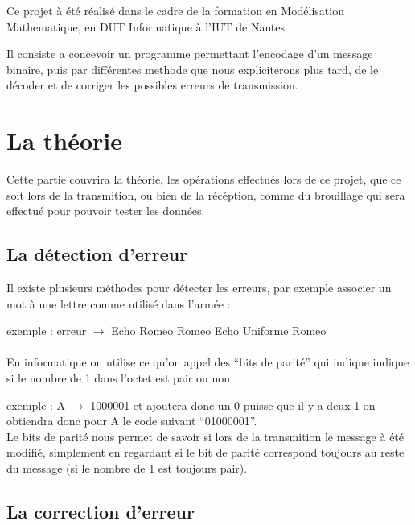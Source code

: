 Ce projet à été réalisé dans le cadre de la formation en Modélisation Mathematique, en DUT Informatique à l'IUT de Nantes.

Il consiste a concevoir un programme permettant l'encodage d'un message binaire, puis par différentes methode que nous expliciterons plus tard, de le décoder et de corriger les possibles erreurs de transmission.


\section{La théorie}
\label{sec:theorie}

Cette partie couvrira la théorie, les opérations effectués lors de ce projet, que ce soit lors de la transmition, ou bien de la récéption, comme du brouillage qui sera effectué pour pouvoir tester les données.

\subsection{La détection d'erreur}
\label{sub:La détection d'erreur}

Il existe plusieurs méthodes pour détecter les erreurs, par exemple associer un mot à une lettre comme utilisé dans l'armée :

\tab exemple : erreur $\rightarrow$ Echo Romeo Romeo Echo Uniforme Romeo
\\
\\ En informatique on utilise ce qu'on appel des ``bits de parité'' qui indique indique si le nombre de 1 dans l'octet est pair ou non

\tab exemple : A $\rightarrow$ 1000001 et ajoutera donc un 0 puisse que il y a deux 1 on obtiendra donc pour A le code suivant ``01000001''.
\\ Le bits de parité nous permet de savoir si lors de la transmition le message à été modifié, simplement en regardant si le bit de parité correspond toujours au reste du message (si le nombre de 1 est toujours pair).

\subsection{La correction d'erreur}
\label{sub:La correction d'erreur}

